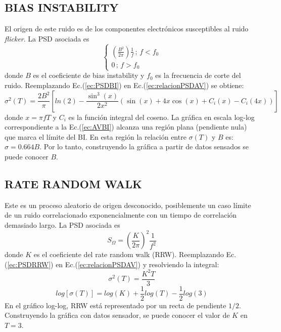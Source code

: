 \documentclass[a4paper,11pt,twoside]{IT-CNEA}
\begin{document}
\subsection{BIAS INSTABILITY}
El origen de este ruido es de los componentes electrónicos susceptibles al ruido \textit{flicker}. La PSD asociada es
\begin{equation}
\begin{cases}
\left( \frac{B^2}{2\pi}\right)\frac{1}{f}\,;\,f<f_0 \\
0\,;\,f>f_0
\end{cases}
\label{ec:PSDBI}
\end{equation}
donde $B$ es el coeficiente de bias instability y $f_0$ es la frecuencia de corte del ruido. Reemplazando Ec.(\ref{ec:PSDBI}) en Ec.(\ref{ec:relacionPSDAV}) se obtiene:
\begin{equation}
\sigma^2(T)=\frac{2B^2}{\pi}\left[ ln(2)-\frac{\sin^3(x)}{2x^2}\left( \sin(x)+4x\cos(x)+C_i(x)-C_i(4x)\right)\right]
\label{ec:AVBI}
\end{equation}
donde $x=\pi fT$ y $C_i$ es la función integral del coseno. La gráfica en escala log-log correspondiente a la Ec.(\ref{ec:AVBI}) alcanza una región plana (pendiente nula) que marca el límite del BI. En esta región la relación entre $\sigma(T)$ y $B$ es: $\sigma=0.664B$. Por lo tanto, construyendo la gráfica a partir de datos sensados se puede conocer $B$.
\subsection{RATE RANDOM WALK}
Este es un proceso aleatorio de origen desconocido, posiblemente un caso límite de un ruido correlacionado exponencialmente con un tiempo de correlación demasiado largo. La PSD asociada es
\begin{equation}
S_{\Omega}=\left( \frac{K}{2\pi}\right)^2\frac{1}{f^2}
\label{ec:PSDRRW}
\end{equation}
donde $K$ es el coeficiente del rate random walk (RRW). Reemplazando Ec.(\ref{ec:PSDRRW}) en Ec.(\ref{ec:relacionPSDAV}) y resolviendo la integral:
\begin{equation}
\sigma^2(T)=\frac{K^2T}{3}
\end{equation}
\begin{equation}
log\left[ \sigma(T)\right]=log(K)+\frac{1}{2}log(T)-\frac{1}{2}log(3)
\end{equation}
En el gráfico log-log, RRW está representado por un recta de pendiente $1/2$. Construyendo la gráfica con datos sensador, se puede conocer el valor de $K$ en $T=3$.
\end{document}
